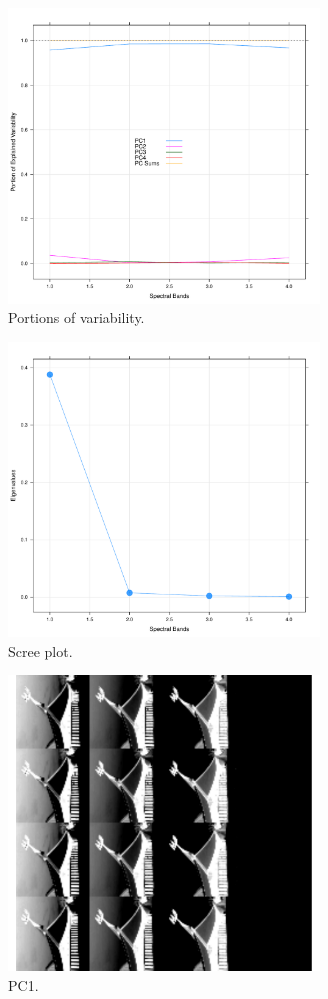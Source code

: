 \documentclass[conference,compsoc]{IEEEtran}
\begin{document}
\begin{figure}[!t]
\centering
\includegraphics[width=3.25in]{portion-of-variability-plot.pdf}
\caption{Portions of variability.}
\label{portion-of-variability}
\end{figure}

\begin{figure}[!t]
\centering
\includegraphics[width=3.25in]{scree-plot.pdf}
\caption{Scree plot.}
\label{scree-plot}
\end{figure}

\begin{figure}[!t]
\centering
\includegraphics[width=3.25in]{pc1.pdf}
\caption{PC1.}
\label{pc1}
\end{figure}
\end{document}
